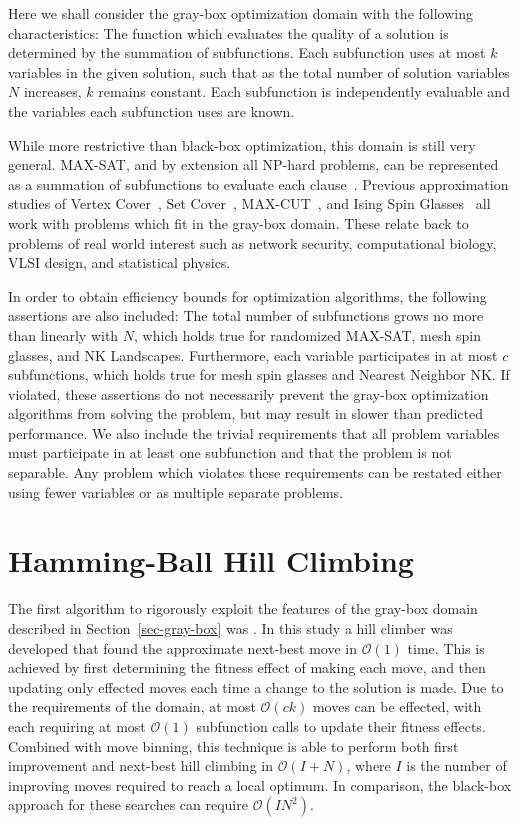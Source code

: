 \documentclass{sig-alternate}
\newcommand{\BigO}[1]{$\mathcal{O}{(#1)}$}
\begin{document}
Here we shall consider the gray-box optimization domain with the following
characteristics: The function which evaluates the quality of a solution is determined by the summation
of subfunctions. Each subfunction uses at most $k$ variables in the given solution,
such that as the total number of solution variables $N$ increases, $k$ remains constant.
Each subfunction is independently evaluable and the variables each subfunction uses are known.

While more restrictive than black-box optimization, this domain is still very general.
MAX-SAT, and by extension all NP-hard problems, can be represented
as a summation of subfunctions to evaluate each clause~\cite{whitley:2013:greedy}.
Previous approximation studies of Vertex Cover~\cite{oliveto:2009:vertexcover},
Set Cover~\cite{yu:2010:setcover}, MAX-CUT~\cite{festa:2002:maxcut}, and
Ising Spin Glasses~\cite{pelikan:2003:hboaising} all work with problems which fit
in the gray-box domain. These relate back to problems of real world interest such
as network security, computational biology, VLSI design, and statistical physics.

In order to obtain efficiency bounds for optimization algorithms, the following
assertions are also included: The total number of subfunctions grows no more than
linearly with $N$, which holds true for randomized MAX-SAT, mesh spin glasses, and NK Landscapes.
Furthermore, each variable participates in at most $c$ subfunctions, which holds true
for mesh spin glasses and Nearest Neighbor NK. If violated, these assertions do not
necessarily prevent the gray-box optimization algorithms from solving the problem, but may result
in slower than predicted performance.
We also include the trivial requirements that all problem variables must participate
in at least one subfunction and that the problem is not separable. Any problem which
violates these requirements can be restated either using fewer variables or as multiple separate problems.

\section{Hamming-Ball Hill Climbing}
\label{sec-hamming}
The first algorithm to rigorously exploit the features of the gray-box domain
described in Section~\ref{sec-gray-box} was \cite{whitley:2013:greedy}. In this study
a hill climber was developed that found the approximate next-best move in \BigO{1} time.
This is achieved by first determining the fitness effect of making each move, and then updating
only effected moves each time a change to the solution is made. Due to the requirements of the domain,
at most \BigO{ck} moves can be effected, with each requiring at most \BigO{1} subfunction calls
to update their fitness effects. Combined with move binning, this technique is able to perform both
first improvement and next-best hill climbing in \BigO{I+N}, where $I$ is the number of improving
moves required to reach a local optimum. In comparison, the black-box approach for these searches can require
\BigO{IN^2}.
\end{document}
